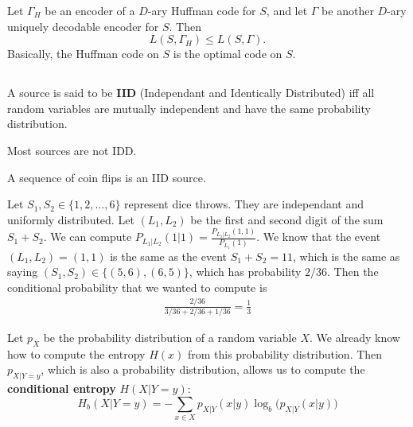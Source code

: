 \documentclass{report}
\begin{document}
\begin{thm}
	Let $\Gamma_H$ be an encoder of a $D$-ary Huffman code for $S$, and let $\Gamma$ be another $D$-ary uniquely decodable encoder for $S$. Then
	\begin{equation}
		L(S, \Gamma_H) \leq L(S, \Gamma).
	\end{equation}
	Basically, the Huffman code on $S$ is the optimal code on $S$.
\end{thm}


\subsection{}

\begin{defn}
	A source is said to be \textbf{IID} (Independant and Identically Distributed) iff all random variables are mutually independent and have the same probability distribution. 
\end{defn}
Most sources are not IDD.

\begin{exmp}
	A sequence of coin flips is an IID source.
\end{exmp}

\begin{exmp}
	Let $S_1, S_2 \in \{1, 2, \ldots, 6\}$ represent dice throws. They are independant and uniformly distributed. Let $(L_1, L_2)$ be the first and second digit of the sum $S_1 + S_2$. We can compute $P_{L_1 | L_2} (1|1) = \frac{P_{L_1 | L_2}(1, 1)}{P_{L_1}(1)}$. We know that the event $(L_1, L_2) = (1, 1)$ is the same as the event $S_1 + S_2 = 11$, which is the same as saying $(S_1, S_2) \in \{(5, 6), (6, 5)\}$, which has probability $2/36$. Then the conditional probability that we wanted to compute is
	\begin{align*}
		\frac{2/36}{3/36 + 2/36 + 1/36} = \frac13
	\end{align*}
\end{exmp}

\begin{defn}
	Let $p_X$ be the probability distribution of a random variable $X$. We already know how to compute the entropy $H(x)$ from this probability distribution. Then $p_{X|Y=y}$, which is also a probability distribution, allows us to compute the \textbf{conditional entropy} $H(X|Y=y)$:
	\begin{equation}
		H_b(X|Y=y) = - \sum_{x \in X} p_{X|Y}(x|y) \log_b \bigl(p_{X|Y}(x|y)\bigr)
	\end{equation} 	
\end{defn}
\end{document}
